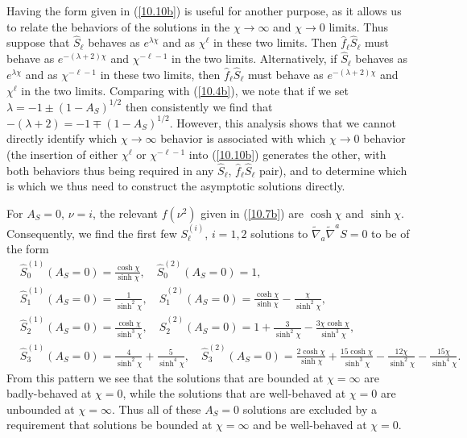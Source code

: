 \documentclass[aps,onecolumn,10pt]{revtex4}
\numberwithin{equation}{section}
\numberwithin{equation}{section}
\begin{document}
Having the form given in (\ref{10.10b}) is  useful for another purpose, as it allows us to relate the behaviors of the solutions in the $\chi\rightarrow \infty$ and $\chi\rightarrow 0$ limits. Thus suppose that $\hat{S}_{\ell}$ behaves as $e^{\lambda\chi}$ and as $\chi^{\ell}$ in these two limits. Then $\hat{f}_{\ell}\hat{S}_{\ell}$ must behave as $e^{-(\lambda+2)\chi}$ and $\chi^{-\ell-1}$ in the two limits. Alternatively, if $\hat{S}_{\ell}$ behaves as $e^{\lambda\chi}$ and as $\chi^{-\ell-1}$ in these two limits, then $\hat{f}_{\ell}\hat{S}_{\ell}$ must behave as $e^{-(\lambda+2)\chi}$ and $\chi^{\ell}$ in the two limits. Comparing with (\ref{10.4b}), we note that if we set $\lambda=-1\pm(1-A_S)^{1/2}$ then consistently we find that $-(\lambda+2)=-1\mp(1-A_S)^{1/2}$. However, this analysis shows that we cannot directly identify which  $\chi\rightarrow \infty$ behavior is associated with which $\chi\rightarrow 0$ behavior (the insertion of either $\chi^{\ell}$ or $\chi^{-\ell -1}$ into (\ref{10.10b}) generates the other, with both behaviors thus being required in any $\hat{S}_{\ell}$, $\hat{f}_{\ell}\hat{S}_{\ell}$ pair), and to determine which is which we thus need to construct the asymptotic solutions directly.

For $A_S=0$, $\nu=i$,  the relevant $f(\nu^2)$ given in (\ref{10.7b}) are $\cosh \chi$ and $\sinh \chi$. 
Consequently, we find the first few $S^{(i)}_{\ell}$, $i=1,2$ solutions to $\tilde{\nabla}_a\tilde{\nabla}^aS=0$ to be of the form 
%
\begin{align}
&\hat{S}^{(1)}_{0}(A_S=0)=\frac{\cosh\chi}{\sinh\chi},\quad \hat{S}^{(2)}_{0}(A_S=0)=1,
\nonumber\\
&\hat{S}^{(1)}_{1}(A_S=0)=\frac{1}{\sinh^2\chi},\quad \hat{S}^{(2)}_{1}(A_S=0)=\frac{\cosh\chi}{\sinh\chi}-\frac{\chi}{\sinh^2\chi},
\nonumber\\
&\hat{S}^{(1)}_{2}(A_S=0)=\frac{\cosh\chi}{\sinh^3\chi},\quad \hat{S}^{(2)}_{2}(A_S=0)=1+\frac{3}{\sinh^2\chi}-\frac{3\chi\cosh\chi}{\sinh^3\chi},
\nonumber\\
&\hat{S}^{(1)}_{3}(A_S=0)=\frac{4}{\sinh^2\chi}+\frac{5}{\sinh^4\chi},\quad \hat{S}^{(2)}_{3}(A_S=0)=
\frac{2\cosh\chi}{\sinh\chi}+\frac{15\cosh\chi}{\sinh^3\chi}-\frac{12\chi}{\sinh^2\chi}-\frac{15\chi}{\sinh^4\chi}.
\label{10.11b}
\end{align}
%
From this pattern we see that the solutions that are bounded at $\chi=\infty$ are badly-behaved at $\chi=0$, while the solutions that are  well-behaved at $\chi=0$ are unbounded at $\chi=\infty$. Thus all of these $A_S=0$ solutions are excluded by a requirement that solutions be  bounded at $\chi=\infty$ and be well-behaved at $\chi=0$.
\end{document}
